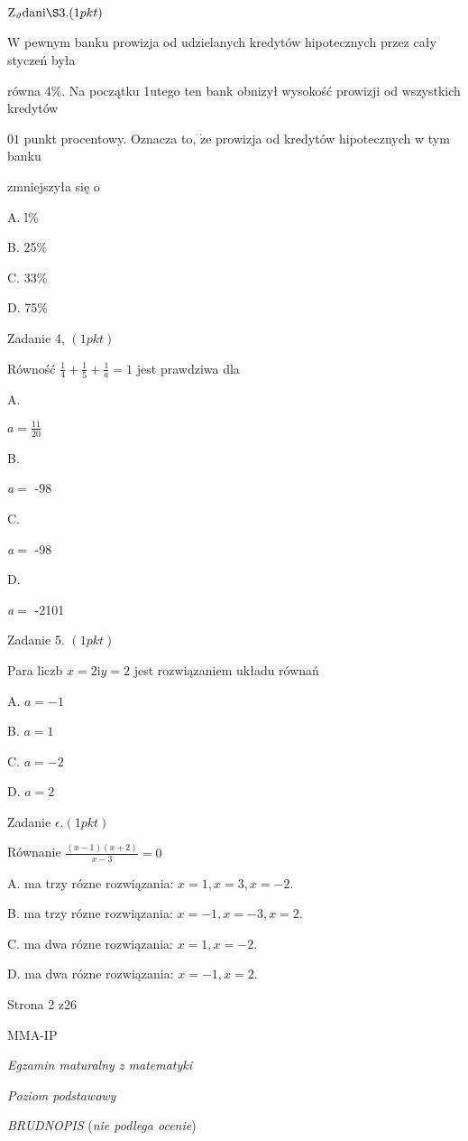 \documentclass[a4paper,12pt]{article}
\begin{document}
$\mathrm{Z}_{\vartheta}\mathrm{d}\mathrm{a}\mathrm{n}\mathrm{i}\S 3. (1pkt)$

$\mathrm{W}$ pewnym banku prowizja od udzielanych kredytów hipotecznych przez cały styczeń była

równa 4\%. Na początku 1utego ten bank obnizył wysokość prowizji od wszystkich kredytów

$0 1$ punkt procentowy. Oznacza to, $\dot{\mathrm{z}}\mathrm{e}$ prowizja od kredytów hipotecznych w tym banku

zmniejszyła się o

A. l\%

B. 25\%

C. 33\%

D. 75\%

Zadanie 4, $(1pkt)$

Równość $\displaystyle \frac{1}{4}+\frac{1}{5}+\frac{1}{a}=1$ jest prawdziwa dla

A.

$a=\displaystyle \frac{11}{20}$

B.

{\it a}$=$ -98

C.

{\it a}$=$ -98

D.

{\it a}$=$ -2101

Zadanie 5. $(1pkt)$

Para liczb $x=2 \mathrm{i}y=2$ jest rozwiązaniem układu równań 

A. $a=-1$

B. $a=1$

C. $a=-2$

D. $a=2$

Zadanie $\epsilon. (1pkt)$

Równanie $\displaystyle \frac{(x-1)(x+2)}{x-3}=0$

A. ma trzy rózne rozwiązania: $x=1, x=3, x=-2.$

B. ma trzy rózne rozwiązania: $x=-1, x=-3, x=2.$

C. ma dwa rózne rozwiązania: $x=1, x=-2.$

D. ma dwa rózne rozwiązania: $x=-1, x=2.$

Strona 2 z26

MMA-IP





{\it Egzamin maturalny z matematyki}

{\it Poziom podstawowy}

{\it BRUDNOPIS} ({\it nie podlega ocenie})
\end{document}
